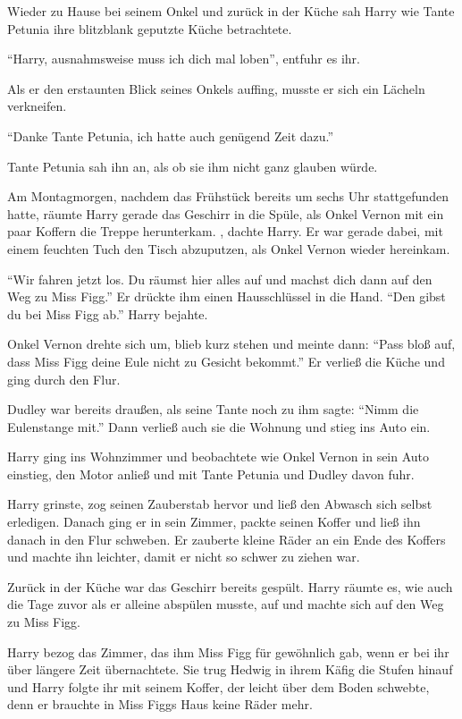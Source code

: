 Wieder zu Hause bei seinem Onkel und zurück in der Küche sah Harry wie Tante Petunia ihre blitzblank geputzte Küche betrachtete.

\enquote{Harry, ausnahmsweise muss ich dich mal loben}, entfuhr es ihr.

Als er den erstaunten Blick seines Onkels auffing, musste er sich ein Lächeln verkneifen.

\enquote{Danke Tante Petunia, ich hatte auch genügend Zeit dazu.} 

Tante Petunia sah ihn an, als ob sie ihm nicht ganz glauben würde.

Am Montagmorgen, nachdem das Frühstück bereits um sechs Uhr stattgefunden hatte, räumte Harry gerade das Geschirr in die Spüle, als Onkel Vernon mit ein paar Koffern die Treppe herunterkam. , dachte Harry. Er war gerade dabei, mit einem feuchten Tuch den Tisch abzuputzen, als Onkel Vernon wieder hereinkam.

\enquote{Wir fahren jetzt los. Du räumst hier alles auf und machst dich dann auf den Weg zu Miss Figg.} Er drückte ihm einen Hausschlüssel in die Hand. \enquote{Den gibst du bei Miss Figg ab.} Harry bejahte.

Onkel Vernon drehte sich um, blieb kurz stehen und meinte dann: \enquote{Pass bloß auf, dass Miss Figg deine Eule nicht zu Gesicht bekommt.} Er verließ die Küche und ging durch den Flur. 

Dudley war bereits draußen, als seine Tante noch zu ihm sagte: \enquote{Nimm die Eulenstange mit.} Dann verließ auch sie die Wohnung und stieg ins Auto ein.

Harry ging ins Wohnzimmer und beobachtete wie Onkel Vernon in sein Auto einstieg, den Motor anließ und mit Tante Petunia und Dudley davon fuhr.

Harry grinste, zog seinen Zauberstab hervor und ließ den Abwasch sich selbst erledigen. Danach ging er in sein Zimmer, packte seinen Koffer und ließ ihn danach in den Flur schweben. Er zauberte kleine Räder an ein Ende des Koffers und machte ihn leichter, damit er nicht so schwer zu ziehen war.

Zurück in der Küche war das Geschirr bereits gespült. Harry räumte es, wie auch die Tage zuvor als er alleine abspülen musste, auf und machte sich auf den Weg zu Miss Figg.

\trenn

Harry bezog das Zimmer, das ihm Miss Figg für gewöhnlich gab, wenn er bei ihr über längere Zeit übernachtete. Sie trug Hedwig in ihrem Käfig die Stufen hinauf und Harry folgte ihr mit seinem Koffer, der leicht über dem Boden schwebte, denn er brauchte in Miss Figgs Haus keine Räder mehr. 

